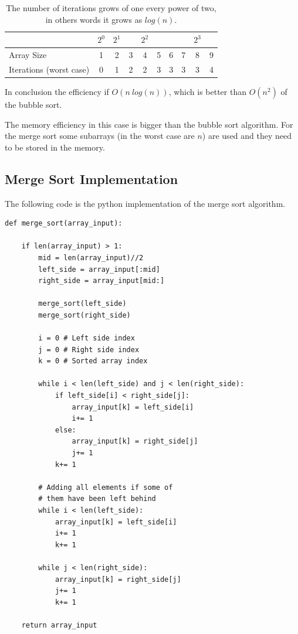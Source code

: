\begin{table}[H]
\caption[Merge Sort Efficiency.]{The number of iterations grows of one every power of two, in others words it grows as \(log(n)\).}
\label{mergesortefficiency}
\centering
\begin{tabular}{ | l | c | c | c | c | c | c | c | c | c |}
   
    \multicolumn{1}{l}{} & \multicolumn{1}{c}{\(2^{0}\)} & 
    \multicolumn{1}{c}{\(2^{1}\)} & \multicolumn{1}{c}{} &
    \multicolumn{1}{c}{\(2^{2}\)} & \multicolumn{1}{c}{} & 
    \multicolumn{1}{c}{} & \multicolumn{1}{c}{}          & 
    \multicolumn{1}{c}{\(2^{3}\)} & \multicolumn{1}{c}{} \\
    \hline
	Array Size & \cellcolor{LightCyan} 1 & \cellcolor{LightCyan} 2 & 3 & \cellcolor{LightCyan} 4 & 5  & 6 & 7 & \cellcolor{LightCyan} 8 & 9 \\
    \hline
	Iterations (worst case) & \cellcolor{LightCyan} 0 & \cellcolor{LightCyan} 1 & 2 & \cellcolor{LightCyan} 2 & 3 & 3 & 3 & \cellcolor{LightCyan} 3 & 4 \\
	\hline	
\end{tabular}
\end{table}

In conclusion the efficiency if \(O(n \ log(n))\), which is better than \(O(n^{2})\) of the bubble sort. 

The memory efficiency in this case is bigger than the bubble sort algorithm. For the merge sort some subarrays (in the worst case are \(n\)) are used and they need to be stored in the memory.

\subsection{Merge Sort Implementation}
The following code is the python implementation of the merge sort algorithm.
\begin{lstlisting}[firstnumber=1, caption={Merge Sort python implementation.}]
def merge_sort(array_input):
	
	if len(array_input) > 1:
		mid = len(array_input)//2
		left_side = array_input[:mid]
		right_side = array_input[mid:]
		
		merge_sort(left_side)
		merge_sort(right_side)
		
		i = 0 # Left side index
		j = 0 # Right side index
		k = 0 # Sorted array index
		
		while i < len(left_side) and j < len(right_side):
			if left_side[i] < right_side[j]:
				array_input[k] = left_side[i]
				i+= 1
			else:
				array_input[k] = right_side[j]
				j+= 1
			k+= 1
			
		# Adding all elements if some of 
        # them have been left behind 
        while i < len(left_side): 
        	array_input[k] = left_side[i] 
            i+= 1
            k+= 1
            
        while j < len(right_side): 
        	array_input[k] = right_side[j] 
            j+= 1
            k+= 1
			
	return array_input
\end{lstlisting}

